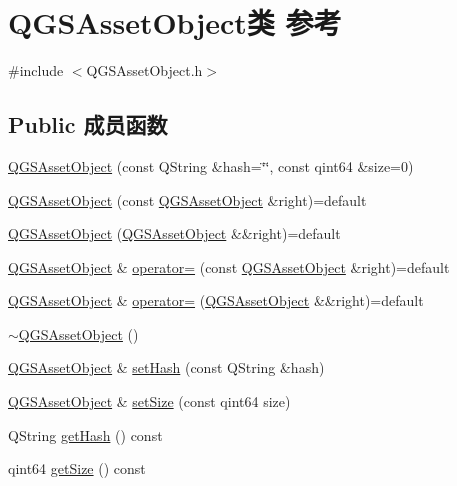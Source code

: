 \hypertarget{class_q_g_s_asset_object}{}\section{Q\+G\+S\+Asset\+Object类 参考}
\label{class_q_g_s_asset_object}


{\ttfamily \#include $<$Q\+G\+S\+Asset\+Object.\+h$>$}

\subsection*{Public 成员函数}
\begin{DoxyCompactItemize}
\item 
\mbox{\hyperlink{class_q_g_s_asset_object_a059432d0edc4b52564ebb13e343f1f7b}{Q\+G\+S\+Asset\+Object}} (const Q\+String \&hash=\char`\"{}\char`\"{}, const qint64 \&size=0)
\item 
\mbox{\hyperlink{class_q_g_s_asset_object_a1192173f7767c13c4d13ff341830be45}{Q\+G\+S\+Asset\+Object}} (const \mbox{\hyperlink{class_q_g_s_asset_object}{Q\+G\+S\+Asset\+Object}} \&right)=default
\item 
\mbox{\hyperlink{class_q_g_s_asset_object_aa35a819b4ea0621ef1696e95c0ace4b5}{Q\+G\+S\+Asset\+Object}} (\mbox{\hyperlink{class_q_g_s_asset_object}{Q\+G\+S\+Asset\+Object}} \&\&right)=default
\item 
\mbox{\hyperlink{class_q_g_s_asset_object}{Q\+G\+S\+Asset\+Object}} \& \mbox{\hyperlink{class_q_g_s_asset_object_a0e7fe5c699edeaf51ef79709dbfde122}{operator=}} (const \mbox{\hyperlink{class_q_g_s_asset_object}{Q\+G\+S\+Asset\+Object}} \&right)=default
\item 
\mbox{\hyperlink{class_q_g_s_asset_object}{Q\+G\+S\+Asset\+Object}} \& \mbox{\hyperlink{class_q_g_s_asset_object_a405e1c3ce2f3b4fe043a3f8c87d3ba7b}{operator=}} (\mbox{\hyperlink{class_q_g_s_asset_object}{Q\+G\+S\+Asset\+Object}} \&\&right)=default
\item 
\mbox{\hyperlink{class_q_g_s_asset_object_abf4ce82c5f881d501b7f91fb0754bcbf}{$\sim$\+Q\+G\+S\+Asset\+Object}} ()
\item 
\mbox{\hyperlink{class_q_g_s_asset_object}{Q\+G\+S\+Asset\+Object}} \& \mbox{\hyperlink{class_q_g_s_asset_object_ad86ed9751f2c0a1e3905aa68b96f452a}{set\+Hash}} (const Q\+String \&hash)
\item 
\mbox{\hyperlink{class_q_g_s_asset_object}{Q\+G\+S\+Asset\+Object}} \& \mbox{\hyperlink{class_q_g_s_asset_object_afed3a4ec141f6e1f48cbe3129601f2d7}{set\+Size}} (const qint64 size)
\item 
Q\+String \mbox{\hyperlink{class_q_g_s_asset_object_adc28463d615c23fcfc8e89e454675472}{get\+Hash}} () const
\item 
qint64 \mbox{\hyperlink{class_q_g_s_asset_object_a18d040d819815f12affc4eefd43f29f1}{get\+Size}} () const
\end{DoxyCompactItemize}


